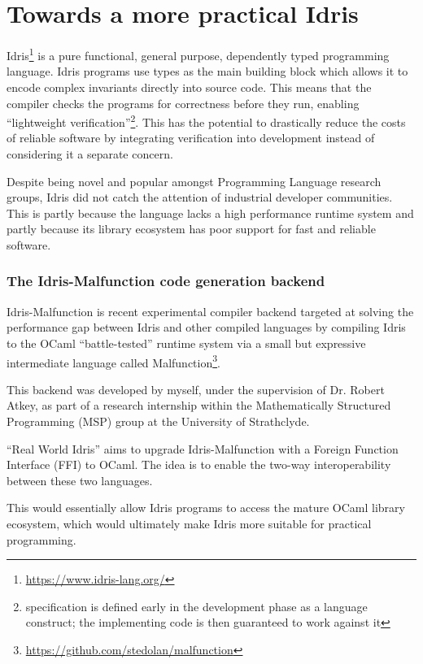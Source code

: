 \section{Towards a more practical Idris}

Idris\footnote{\url{https://www.idris-lang.org/}} is a pure functional,
general purpose, dependently typed programming language.
Idris programs use types as the main building block which allows it
to encode complex invariants directly into source code.
This means that the compiler checks the programs for
correctness before they run, enabling
``lightweight verification''\footnote{specification is
	defined early in the development phase as a language construct;
	the implementing code is then guaranteed to work against it}.
This has the potential to drastically reduce the costs
of reliable software by integrating verification into development
instead of considering it a separate concern.

Despite being novel and popular amongst Programming Language research
groups, Idris did not catch the attention of industrial developer
communities.
This is partly because the language lacks a high performance
runtime system and partly because its library ecosystem has poor
support for fast and reliable software.

\subsubsection{The Idris-Malfunction code generation backend}

Idris-Malfunction is recent experimental compiler backend targeted at
solving the performance gap between Idris and other compiled languages
by compiling Idris to the OCaml ``battle-tested'' runtime system
via a small but expressive intermediate language
called
Malfunction\footnote{\url{https://github.com/stedolan/malfunction}}.

This backend was developed by myself, under the supervision
of Dr. Robert Atkey, as part of a research internship within the
Mathematically Structured Programming (MSP) group at the
University of Strathclyde.

``Real World Idris'' aims to upgrade Idris-Malfunction
with a Foreign Function Interface (FFI) to OCaml.
The idea is to enable the two-way interoperability between these two
languages.

This would essentially allow Idris programs to access the mature OCaml
library ecosystem, which would ultimately make Idris more suitable
for practical programming.


